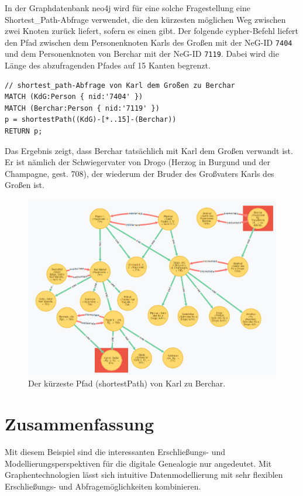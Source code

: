 \documentclass[ngerman,]{scrreprt}
\begin{document}
In der Graphdatenbank neo4j wird für eine solche Fragestellung eine Shortest\_Path-Abfrage verwendet, die den kürzesten möglichen Weg zwischen zwei Knoten zurück liefert, sofern es einen gibt. Der folgende cypher-Befehl liefert den Pfad zwischen dem Personenknoten Karls des Großen mit der NeG-ID \texttt{7404} und dem Personenknoten von Berchar mit der NeG-ID \texttt{7119}. Dabei wird die Länge des abzufragenden Pfades auf 15 Kanten begrenzt.

\begin{verbatim}
// shortest_path-Abfrage von Karl dem Großen zu Berchar
MATCH (KdG:Person { nid:'7404' })
MATCH (Berchar:Person { nid:'7119' })
p = shortestPath((KdG)-[*..15]-(Berchar))
RETURN p;
\end{verbatim}

Das Ergebnis zeigt, dass Berchar tatsächlich mit Karl dem Großen verwandt ist. Er ist nämlich der Schwiegervater von Drogo (Herzog in Burgund und der Champagne, gest. 708), der wiederum der Bruder des Großvaters Karls des Großen ist.

\begin{figure}
\centering
\includegraphics{Bilder/NeG/050-Berchar-Karl-shortestpath.jpg}
\caption{Der kürzeste Pfad (shortestPath) von Karl zu Berchar.}
\end{figure}

\hypertarget{zusammenfassung-3}{%
\section{Zusammenfassung}\label{zusammenfassung-3}}

Mit diesem Beispiel sind die interessanten Erschließungs- und Modellierungsperspektiven für die digitale Genealogie nur angedeutet. Mit Graphentechnologien lässt sich intuitive Datenmodellierung mit sehr flexiblen Erschließungs- und Abfragemöglichkeiten kombinieren.
\end{document}

